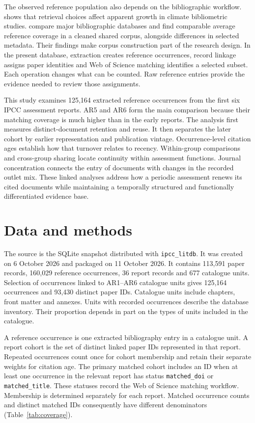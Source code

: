 \documentclass[11pt,a4paper]{article}
\begin{document}
The observed reference population also depends on the bibliographic workflow. \citet{liu2023retrieval} shows that retrieval choices affect apparent growth in climate bibliometric studies. \citet{culbert2025coverage} compare major bibliographic databases and find comparable average reference coverage in a cleaned shared corpus, alongside differences in selected metadata. Their findings make corpus construction part of the research design. In the present database, extraction creates reference occurrences, record linkage assigns paper identities and Web of Science matching identifies a selected subset. Each operation changes what can be counted. Raw reference entries provide the evidence needed to review those assignments.

This study examines 125,164 extracted reference occurrences from the first six IPCC assessment reports. AR5 and AR6 form the main comparison because their matching coverage is much higher than in the early reports. The analysis first measures distinct-document retention and reuse. It then separates the later cohort by earlier representation and publication vintage. Occurrence-level citation ages establish how that turnover relates to recency. Within-group comparisons and cross-group sharing locate continuity within assessment functions. Journal concentration connects the entry of documents with changes in the recorded outlet mix. These linked analyses address how a periodic assessment renews its cited documents while maintaining a temporally structured and functionally differentiated evidence base.

\section{Data and methods}
The source is the SQLite snapshot distributed with \texttt{ipcc\_litdb}. It was created on 6 October 2026 and packaged on 11 October 2026. It contains 113,591 paper records, 160,029 reference occurrences, 36 report records and 677 catalogue units. Selection of occurrences linked to AR1--AR6 catalogue units gives 125,164 occurrences and 93,430 distinct paper IDs. Catalogue units include chapters, front matter and annexes. Units with recorded occurrences describe the database inventory. Their proportion depends in part on the types of units included in the catalogue.

A reference occurrence is one extracted bibliography entry in a catalogue unit. A report cohort is the set of distinct linked paper IDs represented in that report. Repeated occurrences count once for cohort membership and retain their separate weights for citation age. The primary matched cohort includes an ID when at least one occurrence in the relevant report has status \texttt{matched\_doi} or \texttt{matched\_title}. These statuses record the Web of Science matching workflow. Membership is determined separately for each report. Matched occurrence counts and distinct matched IDs consequently have different denominators (Table~\ref{tab:coverage}).
\end{document}
